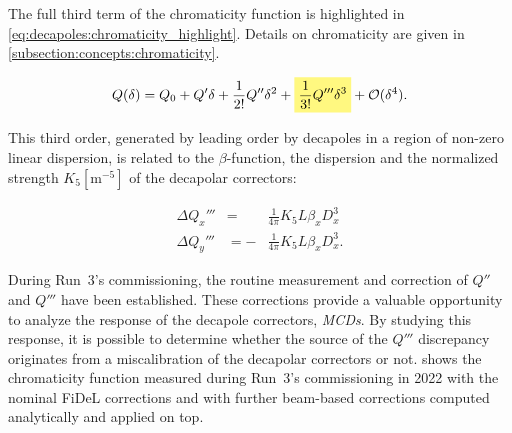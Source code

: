 %


The full third term of the chromaticity function is highlighted in
\cref{eq:decapoles:chromaticity_highlight}. Details on chromaticity are given
in \cref{subsection:concepts:chromaticity}.

\begin{equation} 
    Q (\delta) = Q_0 + Q' \delta + \frac{1}{2!} Q'' \delta^2 
                     + \colorbox{yellow!50}{$\displaystyle  \frac{1}{3!}  Q''' \delta^3$}
                     + \mathcal{O}(\delta^4).
    \label{eq:decapoles:chromaticity_highlight}
\end{equation}

This third order, generated by leading order by decapoles in a region of non-zero linear dispersion,
is related to the $\beta$-function, the dispersion and the normalized strength $K_5 [\text{m}^{-5}]$
of the decapolar correctors:

\begin{equation}
    \begin{aligned}
        \Delta Q_x''' &=  &\frac{1}{4\pi} K_{5} L \beta_x D_x^{3}\\
        \Delta Q_y''' &= -&\frac{1}{4\pi} K_{5} L \beta_x D_x^{3}.
    \end{aligned}
\end{equation}

During Run~3's commissioning, the routine measurement and correction of $Q''$ and $Q'''$ have been
established. These corrections provide a valuable opportunity to analyze the response of the
decapole correctors, \textit{MCDs}. By studying this response, it is possible to determine whether
the source of the $Q'''$ discrepancy originates from a miscalibration of the decapolar
correctors or not.
 shows the chromaticity function measured during
Run~3's commissioning in 2022 with the nominal FiDeL corrections and with further beam-based 
corrections computed analytically and applied on top.

